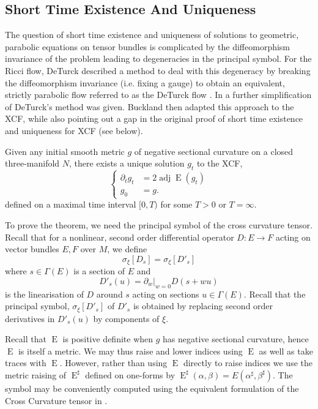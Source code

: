 \documentclass{cambridge7a}
\renewcommand{\~}{\tilde}
\renewcommand{\-}{\bar}
\newcommand{\8}{\infty}
\DeclareMathOperator{\Ein}{E}
\DeclareMathOperator{\adj}{adj}
\begin{document}
\subsection{Short Time Existence And Uniqueness}
\label{subsec:xcf_existence_uniqueness}

The question of short time existence and uniqueness of solutions to geometric, parabolic equations on tensor bundles is complicated by the diffeomorphism invariance of the problem leading to degeneracies in the principal symbol. For the Ricci flow, DeTurck described a method to deal with this degeneracy by breaking the diffeomorphism invariance (i.e. fixing a gauge) to obtain an equivalent, strictly parabolic flow referred to as the DeTurck flow \cite{MR697987}. In \cite[Section 6]{MR1375255} a further simplification of DeTurck's method was given. Buckland then adapted this approach to the XCF, while also pointing out a gap in the original proof of short time existence and uniqueness for XCF \cite{MR2207496} (see  below).

\begin{thm}
\label{thm:xcf_existence_uniqueness}
Given any initial smooth metric \(g\) of negative sectional curvature on a closed three-manifold \(N\), there exists a unique solution \(g_t\) to the XCF,
\[
\begin{cases}
\partial_t g_t &= 2\adj\Ein(g_t) \\
g_0 &= g.
\end{cases}
\]
defined on a maximal time interval \([0, T)\) for some \(T > 0\) or \(T = \infty\).
\end{thm}

To prove the theorem, we need the principal symbol of the cross curvature tensor. Recall that for a nonlinear, second order differential operator \(D : E \to F\) acting on vector bundles \(E, F\) over \(M\), we define
\begin{equation}
\label{eq:symbol}
\sigma_{\xi} [D_s] = \sigma_{\xi} [D'_s]
\end{equation}
where \(s \in \Gamma(E)\) is a section of \(E\) and
\[
D'_s (u) = \partial_w|_{w=0} D(s + w u)
\]
is the linearisation of \(D\) around \(s\) acting on sections \(u \in \Gamma(E)\). Recall that the principal symbol, \(\sigma_{\xi} [D'_s]\) of \(D'_s\) is obtained by replacing second order derivatives in \(D'_s (u)\) by components of \(\xi\).

Recall that \(\Ein\) is positive definite when \(g\) has negative sectional curvature, hence \(\Ein\) is itself a metric. We may thus raise and lower indices using \(\Ein\) as well as take traces with \(\Ein\). However, rather than using \(\Ein\) directly to raise indices we use the metric raising of \(\Ein^{\sharp}\) defined on one-forms by \(\Ein^{\sharp} (\alpha, \beta) = E(\alpha^{\sharp}, \beta^{\sharp})\). The symbol may be conveniently computed using the equivalent formulation of the Cross Curvature tensor in .
\end{document}
